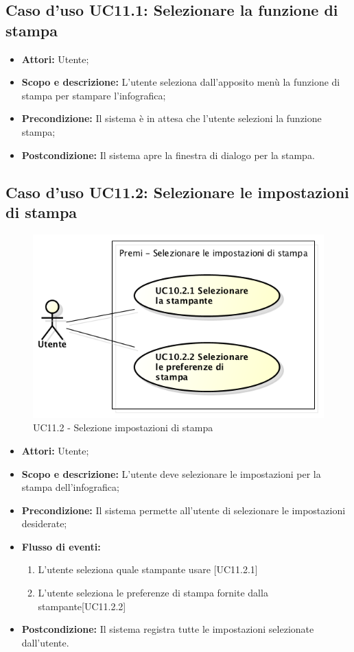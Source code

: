 \subsection{Caso d'uso UC11.1: Selezionare la funzione di stampa}
\begin{itemize}
	\item \textbf{Attori:} Utente;
	\item \textbf{Scopo e descrizione:} L'utente seleziona dall'apposito menù la funzione di stampa per stampare l'infografica;
	\item \textbf{Precondizione:} Il sistema è in attesa che l'utente selezioni la funzione stampa;
	\item \textbf{Postcondizione:} Il sistema apre la finestra di dialogo per la stampa.
\end{itemize}

\subsection{Caso d'uso UC11.2: Selezionare le impostazioni di stampa}
\begin{figure}[h] 
	\centering 
	\includegraphics[scale=0.45] {img/UC11.2.png} 
	\caption{UC11.2 - Selezione impostazioni di stampa} 
\end{figure}

\begin{itemize}
	\item \textbf{Attori:} Utente;
	\item \textbf{Scopo e descrizione:} L'utente deve selezionare le impostazioni per la stampa dell'infografica;
	\item \textbf{Precondizione:} Il sistema permette all'utente di selezionare le impostazioni desiderate;
	\item \textbf{Flusso di eventi:}
	\begin{enumerate}
		\item L'utente seleziona quale stampante usare [UC11.2.1]
		\item L'utente seleziona le preferenze di stampa fornite dalla stampante[UC11.2.2]
	\end{enumerate}
	\item \textbf{Postcondizione:} Il sistema registra tutte le impostazioni selezionate dall'utente.
\end{itemize}
	
